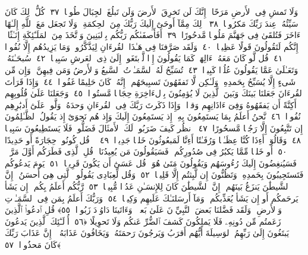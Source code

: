  وَلَا تَمشِ فِى ٱلأَرضِ مَرَحًا ۖ إِنَّكَ لَن تَخرِقَ ٱلأَرضَ وَلَن تَبلُغَ ٱلجِبَالَ طُولًۭا ﴿٣٧﴾
 كُلُّ ذَٟلِكَ كَانَ سَيِّئُهُۥ عِندَ رَبِّكَ مَكرُوهًۭا ﴿٣٨﴾
 ذَٟلِكَ مِمَّآ أَوحَىٰٓ إِلَيكَ رَبُّكَ مِنَ ٱلحِكمَةِ ۗ وَلَا تَجعَل مَعَ ٱللَّهِ إِلَـٰهًا ءَاخَرَ فَتُلقَىٰ فِى جَهَنَّمَ مَلُومًۭا مَّدحُورًا ﴿٣٩﴾
 أَفَأَصفَىٰكُم رَبُّكُم بِٱلبَنِينَ وَٱتَّخَذَ مِنَ ٱلمَلَـٰٓئِكَةِ إِنَـٰثًا ۚ إِنَّكُم لَتَقُولُونَ قَولًا عَظِيمًۭا ﴿٤٠﴾
 وَلَقَد صَرَّفنَا فِى هَـٰذَا ٱلقُرءَانِ لِيَذَّكَّرُوا۟ وَمَا يَزِيدُهُم إِلَّا نُفُورًۭا ﴿٤١﴾
 قُل لَّو كَانَ مَعَهُۥٓ ءَالِهَةٌۭ كَمَا يَقُولُونَ إِذًۭا لَّٱبتَغَوا۟ إِلَىٰ ذِى ٱلعَرشِ سَبِيلًۭا ﴿٤٢﴾
 سُبحَـٰنَهُۥ وَتَعَـٰلَىٰ عَمَّا يَقُولُونَ عُلُوًّۭا كَبِيرًۭا ﴿٤٣﴾
 تُسَبِّحُ لَهُ ٱلسَّمَـٰوَٟتُ ٱلسَّبعُ وَٱلأَرضُ وَمَن فِيهِنَّ ۚ وَإِن مِّن شَىءٍ إِلَّا يُسَبِّحُ بِحَمدِهِۦ وَلَـٰكِن لَّا تَفقَهُونَ تَسبِيحَهُم ۗ إِنَّهُۥ كَانَ حَلِيمًا غَفُورًۭا ﴿٤٤﴾
 وَإِذَا قَرَأتَ ٱلقُرءَانَ جَعَلنَا بَينَكَ وَبَينَ ٱلَّذِينَ لَا يُؤمِنُونَ بِٱلءَاخِرَةِ حِجَابًۭا مَّستُورًۭا ﴿٤٥﴾
 وَجَعَلنَا عَلَىٰ قُلُوبِهِم أَكِنَّةً أَن يَفقَهُوهُ وَفِىٓ ءَاذَانِهِم وَقرًۭا ۚ وَإِذَا ذَكَرتَ رَبَّكَ فِى ٱلقُرءَانِ وَحدَهُۥ وَلَّوا۟ عَلَىٰٓ أَدبَٰرِهِم نُفُورًۭا ﴿٤٦﴾
 نَّحنُ أَعلَمُ بِمَا يَستَمِعُونَ بِهِۦٓ إِذ يَستَمِعُونَ إِلَيكَ وَإِذ هُم نَجوَىٰٓ إِذ يَقُولُ ٱلظَّـٰلِمُونَ إِن تَتَّبِعُونَ إِلَّا رَجُلًۭا مَّسحُورًا ﴿٤٧﴾
 ٱنظُر كَيفَ ضَرَبُوا۟ لَكَ ٱلأَمثَالَ فَضَلُّوا۟ فَلَا يَستَطِيعُونَ سَبِيلًۭا ﴿٤٨﴾
 وَقَالُوٓا۟ أَءِذَا كُنَّا عِظَـٰمًۭا وَرُفَـٰتًا أَءِنَّا لَمَبعُوثُونَ خَلقًۭا جَدِيدًۭا ﴿٤٩﴾
 ۞ قُل كُونُوا۟ حِجَارَةً أَو حَدِيدًا ﴿٥٠﴾
 أَو خَلقًۭا مِّمَّا يَكبُرُ فِى صُدُورِكُم ۚ فَسَيَقُولُونَ مَن يُعِيدُنَا ۖ قُلِ ٱلَّذِى فَطَرَكُم أَوَّلَ مَرَّةٍۢ ۚ فَسَيُنغِضُونَ إِلَيكَ رُءُوسَهُم وَيَقُولُونَ مَتَىٰ هُوَ ۖ قُل عَسَىٰٓ أَن يَكُونَ قَرِيبًۭا ﴿٥١﴾
 يَومَ يَدعُوكُم فَتَستَجِيبُونَ بِحَمدِهِۦ وَتَظُنُّونَ إِن لَّبِثتُم إِلَّا قَلِيلًۭا ﴿٥٢﴾
 وَقُل لِّعِبَادِى يَقُولُوا۟ ٱلَّتِى هِىَ أَحسَنُ ۚ إِنَّ ٱلشَّيطَٰنَ يَنزَغُ بَينَهُم ۚ إِنَّ ٱلشَّيطَٰنَ كَانَ لِلإِنسَـٰنِ عَدُوًّۭا مُّبِينًۭا ﴿٥٣﴾
 رَّبُّكُم أَعلَمُ بِكُم ۖ إِن يَشَأ يَرحَمكُم أَو إِن يَشَأ يُعَذِّبكُم ۚ وَمَآ أَرسَلنَـٰكَ عَلَيهِم وَكِيلًۭا ﴿٥٤﴾
 وَرَبُّكَ أَعلَمُ بِمَن فِى ٱلسَّمَـٰوَٟتِ وَٱلأَرضِ ۗ وَلَقَد فَضَّلنَا بَعضَ ٱلنَّبِيِّۦنَ عَلَىٰ بَعضٍۢ ۖ وَءَاتَينَا دَاوُۥدَ زَبُورًۭا ﴿٥٥﴾
 قُلِ ٱدعُوا۟ ٱلَّذِينَ زَعَمتُم مِّن دُونِهِۦ فَلَا يَملِكُونَ كَشفَ ٱلضُّرِّ عَنكُم وَلَا تَحوِيلًا ﴿٥٦﴾
 أُو۟لَـٰٓئِكَ ٱلَّذِينَ يَدعُونَ يَبتَغُونَ إِلَىٰ رَبِّهِمُ ٱلوَسِيلَةَ أَيُّهُم أَقرَبُ وَيَرجُونَ رَحمَتَهُۥ وَيَخَافُونَ عَذَابَهُۥٓ ۚ إِنَّ عَذَابَ رَبِّكَ كَانَ مَحذُورًۭا ﴿٥٧﴾

